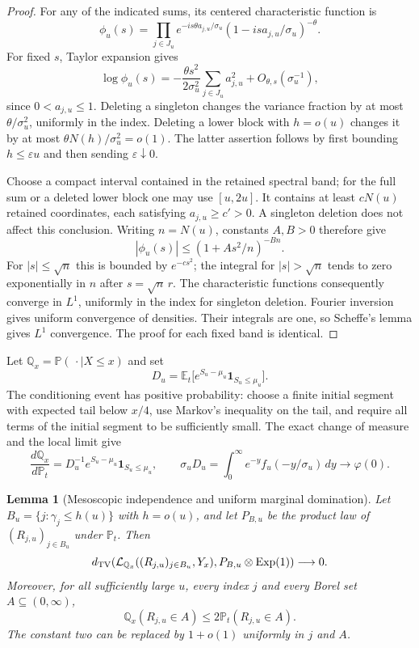 \documentclass[11pt]{article}
\newtheorem{lemma}[theorem]{Lemma}
\theoremstyle{definition}
\theoremstyle{remark}
\begin{document}
\begin{proof}
For any of the indicated sums, its centered characteristic function is
\[
 \phi_u(s)=\prod_{j\in J_u}
       e^{-is\theta a_{j,u}/\sigma_u}
       (1-is a_{j,u}/\sigma_u)^{-\theta}.
\]
For fixed $s$, Taylor expansion gives
\[
 \log\phi_u(s)=
 -\frac{\theta s^2}{2\sigma_u^2}\sum_{j\in J_u}a_{j,u}^2
 +O_{\theta,s}(\sigma_u^{-1}),
\]
since $0<a_{j,u}\le1$.  Deleting a singleton changes the variance fraction
by at most $\theta/\sigma_u^2$, uniformly in the index.  Deleting a lower
block with $h=o(u)$ changes it by at most
$\theta N(h)/\sigma_u^2=o(1)$.  The latter assertion follows by first
bounding $h\le\varepsilon u$ and then sending $\varepsilon\downarrow0$.

Choose a compact interval contained in the retained spectral band;
for the full sum or a deleted lower block one may use $[u,2u]$.
It contains at least $cN(u)$ retained coordinates, each satisfying
$a_{j,u}\ge c'>0$.  A singleton deletion does not affect this conclusion.
Writing $n=N(u)$, constants $A,B>0$ therefore give
\[
 |\phi_u(s)|\le(1+As^2/n)^{-Bn}.
\]
For $|s|\le\sqrt n$ this is bounded by $e^{-cs^2}$; the integral for
$|s|>\sqrt n$ tends to zero exponentially in $n$ after $s=\sqrt n\,r$.
The characteristic functions consequently converge in $L^1$, uniformly
in the index for singleton deletion.  Fourier inversion gives uniform
convergence of densities.  Their integrals are one, so Scheffe's lemma
gives $L^1$ convergence.  The proof for each fixed band is identical.
\end{proof}

Let $\mathbb Q_x=\mathbb P(\,\cdot\mid X\le x)$ and set
\[
 D_u=\mathbb E_t\bigl[e^{S_u-\mu_u}\mathbf1_{S_u\le\mu_u}\bigr].
\]
The conditioning event has positive probability: choose a finite initial
segment with expected tail below $x/4$, use Markov's inequality on the
tail, and require all terms of the initial segment to be sufficiently
small.  The exact change of measure and the local limit give
\begin{equation}\label{ext:eq:D}
 \frac{d\mathbb Q_x}{d\mathbb P_t}
       =D_u^{-1}e^{S_u-\mu_u}\mathbf1_{S_u\le\mu_u},\qquad
 \sigma_uD_u=\int_0^\infty e^{-y}f_u(-y/\sigma_u)\,dy
       \longrightarrow\varphi(0).
\end{equation}

\begin{lemma}[Mesoscopic independence and uniform marginal domination]
\label{ext:lem:conditioning}
Let $B_u=\{j:\gamma_j\le h(u)\}$ with $h=o(u)$, and let $P_{B,u}$ be
the product law of $(R_{j,u})_{j\in B_u}$ under $\mathbb P_t$.
Then
\begin{equation}\label{ext:eq:blockTV}
 d_{\rm TV}\!\left(
   \mathcal L_{\mathbb Q_x}((R_{j,u})_{j\in B_u},Y_x),
   P_{B,u}\otimes\mathrm{Exp}(1)\right)\longrightarrow0.
\end{equation}
Moreover, for all sufficiently large $u$, every index $j$ and every
Borel set $A\subseteq(0,\infty)$,
\begin{equation}\label{ext:eq:marginaldom}
 \mathbb Q_x(R_{j,u}\in A)\le2\mathbb P_t(R_{j,u}\in A).
\end{equation}
The constant two can be replaced by $1+o(1)$ uniformly in $j$ and $A$.
\end{lemma}
\end{document}
